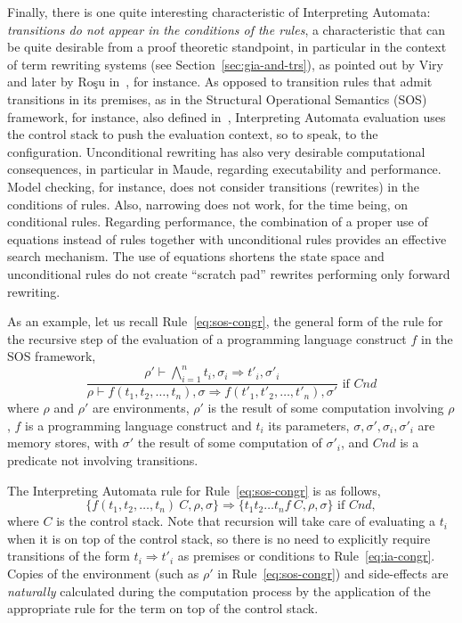 \documentclass[a4paper,openany]{book}
\begin{document}
Finally, there is one quite interesting characteristic of Interpreting
Automata:
\emph{transitions do not appear in the conditions of the rules}, a
characteristic that can be quite desirable from a proof theoretic
standpoint, in particular in the context of term rewriting systems (see Section~\ref{sec:gia-and-trs}), as
pointed out by Viry~\cite{zbMATH01440294} and later by Ro\c{s}u in~\cite{10.1007/978-3-540-31959-7-13}, for instance. 
As opposed to transition rules that admit transitions in its premises, as in the Structural Operational Semantics (SOS) framework, for instance, also defined in~\cite{plotkin}, Interpreting Automata evaluation uses the control stack to push the evaluation context, so to speak, to the configuration. Unconditional rewriting has also very desirable computational consequences, in particular in Maude, regarding executability and performance. Model checking, for instance, does not consider transitions (rewrites) in the conditions of rules. Also, narrowing does not work, for the time being, on conditional rules. Regarding performance, the combination of a proper use of equations instead of rules together with unconditional rules provides an effective search mechanism. The use of equations shortens the state space and unconditional rules do not create ``scratch pad''  
rewrites performing only forward rewriting.

As an example, let us recall Rule~\ref{eq:sos-congr}, the general form of the rule for 
the recursive step of the evaluation of a programming language
construct $f$ in the SOS framework, 
\begin{equation}
\frac{\rho' \vdash \bigwedge^n_{i=1} t_i, \sigma_i \Rightarrow t'_i, \sigma'_i}
     {\rho \vdash f(t_1, t_2, \ldots, t_n), \sigma
       \Rightarrow f(t'_1, t'_2, \ldots, t'_n), \sigma'} \mbox{ if } \mathit{Cnd} \nonumber
\end{equation}
where $\rho$ and $\rho'$ are environments, $\rho'$ is the result of
some computation involving $\rho$, $f$ is a programming language
construct and $t_i$ its parameters,
$\sigma, \sigma', \sigma_i, \sigma'_i$ are memory stores, with
$\sigma'$ the result of some computation of $\sigma'_i$, and
$\mathit{Cnd}$ is a predicate not involving transitions.

The Interpreting Automata rule for Rule~\ref{eq:sos-congr} is as follows,
\begin{equation}\label{eq:ia-congr}
\{f(t_1, t_2, \ldots, t_n)~ C, \rho, \sigma\} \Rightarrow
\{t_1 t_2 \ldots t_n f ~ C, \rho, \sigma\} \mbox{ if } \mathit{Cnd},
\end{equation}
where $C$ is the control stack. Note that recursion will take care of
evaluating a $t_i$ when it is on top of the control stack, so there is
no need to explicitly require transitions of the form $t_i \Rightarrow
t'_i$ as premises or conditions to Rule~\ref{eq:ia-congr}. Copies of
the environment (such as $\rho'$ in Rule~\ref{eq:sos-congr}) and
side-effects are \emph{naturally} calculated during the computation
process by the application of the appropriate rule for the term on top
of the control stack.
\end{document}
